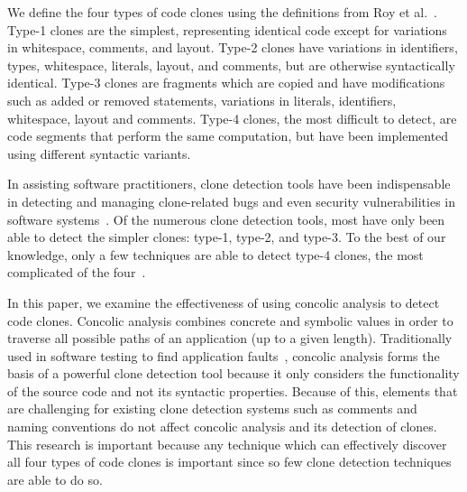 \documentclass{sig-alternate}
\begin{document}
 
 
 


We define the four types of code clones using the definitions from Roy et al.~\cite{Roy:2009:CEC:1530898.1531101}. Type-1 clones are the simplest, representing identical code except for variations in whitespace, comments, and layout. Type-2 clones have variations in identifiers, types, whitespace, literals, layout, and comments, but are otherwise syntactically identical. Type-3 clones are fragments which are copied and have modifications such as added or removed statements, variations in literals, identifiers, whitespace, layout and comments. Type-4 clones, the most difficult to detect, are code segments that perform the same computation, but have been implemented using different syntactic variants.

In assisting software practitioners, clone detection tools have been indispensable in detecting and managing clone-related bugs and even security vulnerabilities in software systems~\cite{Dang:2012:XTC:2420950.2421004}. Of the numerous clone detection tools, most have only been able to detect the simpler clones: type-1, type-2, and type-3. To the best of our knowledge, only a few techniques are able to detect type-4 clones, the most complicated of the four~\cite{Roy:2009:CEC:1530898.1531101}.



In this paper, we examine the effectiveness of using concolic analysis to detect code clones. Concolic analysis combines concrete and symbolic values in order to traverse all possible paths of an application (up to a given length). Traditionally used in software testing to find application faults~\cite{Kiezun:2013:HSW:2377656.2377662}, concolic analysis forms the basis of a powerful clone detection tool because it only considers the functionality of the source code and not its syntactic properties. Because of this, elements that are challenging for existing clone detection systems such as comments and naming conventions do not affect concolic analysis and its detection of clones. This research is important because any technique which can effectively discover all four types of code clones is important since so few clone detection techniques are able to do so. \\ \\ \\ \\ 
\end{document}
